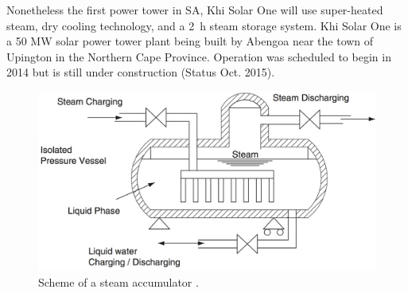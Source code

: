\documentclass[Master,MEE,english]{twbook}%
\begin{document}
Nonetheless the first power tower in SA, Khi Solar One will use super-heated steam, dry cooling technology, and a 2~h steam storage system. Khi Solar One is a 50 MW solar power tower plant being built by Abengoa near the town of Upington in the Northern Cape Province. Operation was scheduled to begin in 2014 but is still under construction (Status Oct. 2015). \cite{Abengoa2014,NREL2014}\\
\begin{figure}[!htbp]  
\centering
\includegraphics[width=0.7\linewidth]{FIG/SteamAccumulatot}
\caption[Scheme of a steam accumulator.]{Scheme of a steam accumulator \cite{Steinmann2006}.}\label{SteamAccumulatot}
\end{figure}
\end{document}
